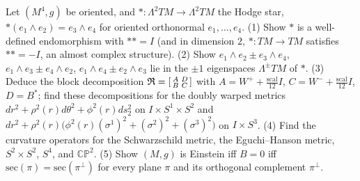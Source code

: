 \begin{remark}
  \label{rem:pet-ch4-ex-28}
  Let $(M^4,g)$ be oriented, and $*:\Lambda^2TM\to\Lambda^2TM$ the Hodge star,
  $*(e_1\wedge e_2)=e_3\wedge e_4$ for oriented orthonormal $e_1,\dots,e_4$. (1)
  Show $*$ is a well-defined endomorphism with $**=I$ (and in dimension $2$,
  $*:TM\to TM$ satisfies $**=-I$, an almost complex structure). (2) Show
  $e_1\wedge e_2\pm e_3\wedge e_4$, $e_1\wedge e_3\pm e_4\wedge e_2$,
  $e_1\wedge e_4\pm e_2\wedge e_3$ lie in the $\pm1$ eigenspaces
  $\Lambda^\pm TM$ of $*$. (3) Deduce the block decomposition
  $\mathfrak R=\begin{bsmallmatrix}A&D\\B&C\end{bsmallmatrix}$ with
  $A=W^++\tfrac{\mathrm{scal}}{12}I$, $C=W^-+\tfrac{\mathrm{scal}}{12}I$,
  $D=B^*$; find these decompositions for the doubly warped metrics
  $dr^2+\rho^2(r)d\theta^2+\phi^2(r)ds_2^2$ on $I\times S^1\times S^2$ and
  $dr^2+\rho^2(r)\big(\phi^2(r)(\sigma^1)^2+(\sigma^2)^2+(\sigma^3)^2\big)$ on
  $I\times S^3$. (4) Find the curvature operators for the Schwarzschild
  metric, the Eguchi--Hanson metric, $S^2\times S^2$, $S^4$, and $\mathbb{CP}^2$.
  (5) Show $(M,g)$ is Einstein iff $B=0$ iff $\mathrm{sec}(\pi)=\mathrm{sec}(\pi^\perp)$
  for every plane $\pi$ and its orthogonal complement $\pi^\perp$.
\end{remark}

